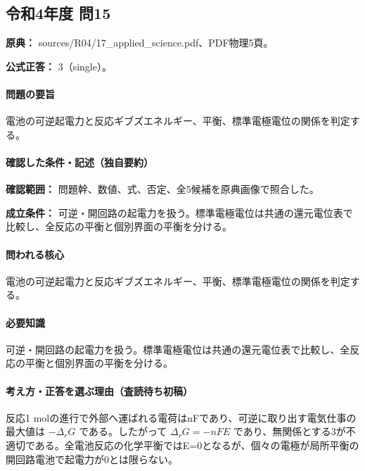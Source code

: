 \subsection{令和4年度 問15}
\label{q:r04-reg-applied-15}

\noindent\textbf{原典：} sources/R04/17\_applied\_science.pdf、PDF物理5頁。

\textbf{公式正答：} 3（single）。

\paragraph{問題の要旨} 電池の可逆起電力と反応ギブズエネルギー、平衡、標準電極電位の関係を判定する。

\paragraph{確認した条件・記述（独自要約）}\mbox{}\par

\noindent\textbf{確認範囲：} 問題幹、数値、式、否定、全5候補を原典画像で照合した。\par

\noindent\textbf{成立条件：} 可逆・開回路の起電力を扱う。標準電極電位は共通の還元電位表で比較し、全反応の平衡と個別界面の平衡を分ける。\par

\paragraph{問われる核心} 電池の可逆起電力と反応ギブズエネルギー、平衡、標準電極電位の関係を判定する。

\paragraph{必要知識} 可逆・開回路の起電力を扱う。標準電極電位は共通の還元電位表で比較し、全反応の平衡と個別界面の平衡を分ける。

\paragraph{考え方・正答を選ぶ理由（査読待ち初稿）} 反応1 molの進行で外部へ運ばれる電荷はnFであり、可逆に取り出す電気仕事の最大値は \(-\Delta_rG\) である。したがって \(\Delta_rG=-nFE\) であり、無関係とする3が不適切である。全電池反応の化学平衡ではE=\allowbreak{}0となるが、個々の電極が局所平衡の開回路電池で起電力が0とは限らない。


